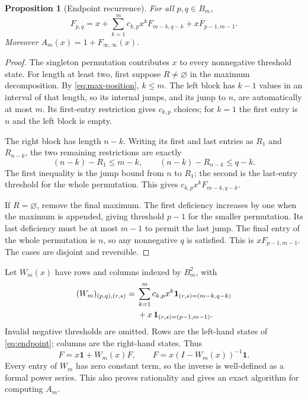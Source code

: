 \documentclass[11pt,a4paper]{article}
\newtheorem{proposition}[proposition]{Proposition}
\theoremstyle{definition}\newaliascnt{definition}{theorem}
\theoremstyle{remark}\newaliascnt{remark}{theorem}
\newcommand{\one}{\mathbf 1}
\begin{document}
\begin{proposition}[Endpoint recurrence]\label{prop:endpoint}
For all $p,q\in B_m$,
\begin{equation}
 F_{p,q}=x+\sum_{k=1}^m c_{k,p}x^kF_{m-k,q-k}
                   +xF_{p-1,m-1}.
 \label{eq:endpoint}
\end{equation}
Moreover $A_m(x)=1+F_{\infty,\infty}(x)$.
\end{proposition}
\begin{proof}
The singleton permutation contributes $x$ to every nonnegative threshold
state. For length at least two, first suppose $R\ne\varnothing$ in the
maximum decomposition. By \eqref{eq:max-position}, $k\le m$.
The left block has $k-1$ values in an interval of that length, so its internal
jumps, and its jump to $n$, are automatically at most $m$. Its first-entry
restriction gives $c_{k,p}$ choices; for $k=1$ the first entry is $n$ and the
left block is empty.

The right block has length $n-k$. Writing its first and last entries as
$R_1$ and $R_{n-k}$, the two remaining restrictions are exactly
\[
 (n-k)-R_1\le m-k,\qquad
 (n-k)-R_{n-k}\le q-k.
\]
The first inequality is the jump bound from $n$ to $R_1$; the second is the
last-entry threshold for the whole permutation. This gives
$c_{k,p}x^kF_{m-k,q-k}$.

If $R=\varnothing$, remove the final maximum. The first deficiency increases
by one when the maximum is appended, giving threshold $p-1$ for the smaller
permutation. Its last deficiency must be at most $m-1$ to permit the last
jump. The final entry of the whole permutation is $n$, so any nonnegative
$q$ is satisfied. This is $xF_{p-1,m-1}$. The cases are disjoint and reversible.
\end{proof}

Let $W_m(x)$ have rows and columns indexed by $B_m^2$, with
\begin{align}
 (W_m)_{(p,q),(r,s)}={}&
  \sum_{k=1}^m c_{k,p}x^k
       \mathbf1_{(r,s)=(m-k,q-k)}\notag\\
 &+x\,\mathbf1_{(r,s)=(p-1,m-1)}.
 \label{eq:matrix}
\end{align}
Invalid negative thresholds are omitted. Rows are the left-hand states of
\eqref{eq:endpoint}; columns are the right-hand states. Thus
\begin{equation}
 F=x\one+W_m(x)F,
 \qquad F=x(I-W_m(x))^{-1}\one.
 \label{eq:matrix-system}
\end{equation}
Every entry of $W_m$ has zero constant term, so the inverse is well-defined
as a formal power series. This also proves rationality and gives an exact
algorithm for computing $A_m$.
\end{document}
